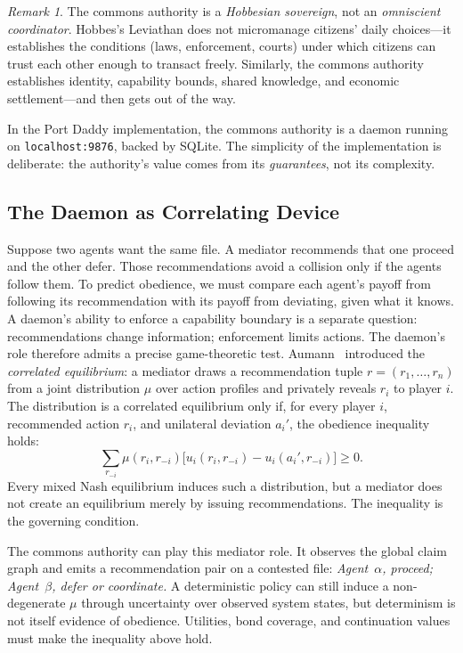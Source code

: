 \documentclass[11pt,a4paper]{article}
\theoremstyle{definition}
\theoremstyle{remark}
\newtheorem*{remark}{Remark}
\begin{document}
\begin{remark}
The commons authority is a \emph{Hobbesian sovereign}, not an \emph{omniscient coordinator}. Hobbes's Leviathan does not micromanage citizens' daily choices---it establishes the conditions (laws, enforcement, courts) under which citizens can trust each other enough to transact freely. Similarly, the commons authority establishes identity, capability bounds, shared knowledge, and economic settlement---and then gets out of the way.
\end{remark}
In the Port Daddy implementation, the commons authority is a daemon running on \texttt{localhost:9876}, backed by SQLite. The simplicity of the implementation is deliberate: the authority's value comes from its \emph{guarantees}, not its complexity.
\subsection{The Daemon as Correlating Device}\label{sec:correlating-device}
Suppose two agents want the same file. A mediator recommends that one proceed and the other defer. Those recommendations avoid a collision only if the agents follow them. To predict obedience, we must compare each agent's payoff from following its recommendation with its payoff from deviating, given what it knows. A daemon's ability to enforce a capability boundary is a separate question: recommendations change information; enforcement limits actions.
%
The daemon's role therefore admits a precise game-theoretic test. Aumann~ introduced the \emph{correlated equilibrium}: a mediator draws a recommendation tuple $r=(r_1,\ldots,r_n)$ from a joint distribution $\mu$ over action profiles and privately reveals $r_i$ to player $i$. The distribution is a correlated equilibrium only if, for every player $i$, recommended action $r_i$, and unilateral deviation $a_i'$, the obedience inequality holds:
\[
\sum_{r_{-i}} \mu(r_i,r_{-i})
\bigl[u_i(r_i,r_{-i})-u_i(a_i',r_{-i})\bigr] \ge 0.
\]
Every mixed Nash equilibrium induces such a distribution, but a mediator does not create an equilibrium merely by issuing recommendations. The inequality is the governing condition.

The commons authority can play this mediator role. It observes the global claim graph and emits a recommendation pair on a contested file: \emph{Agent~$\alpha$, proceed; Agent~$\beta$, defer or coordinate.} A deterministic policy can still induce a non-degenerate $\mu$ through uncertainty over observed system states, but determinism is not itself evidence of obedience. Utilities, bond coverage, and continuation values must make the inequality above hold.
\end{document}
